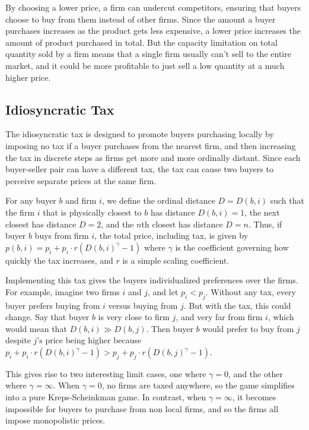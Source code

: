 \documentclass[11pt]{article}
\begin{document}
By choosing a lower price, a firm can undercut competitors, ensuring that
buyers choose to buy from them instead of other firms. Since the amount a buyer
purchases increases as the product gets less expensive, a lower price increases
the amount of product purchased in total. But the capacity limitation on total
quantity sold by a firm means that a single firm usually can't sell to the
entire market, and it could be more profitable to just sell a low quantity at a
much higher price.

\subsection{Idiosyncratic Tax}
The idiosyncratic tax is designed to promote buyers purchasing locally by
imposing no tax if a buyer purchases from the nearest firm, and then increasing
the tax in discrete steps as firms get more and more ordinally distant. Since
each buyer-seller pair can have a different tax, the tax can cause two buyers
to perceive separate prices at the same firm.

For any buyer $b$ and firm $i$, we define the ordinal distance $D = D(b,i)$
such that the firm $i$ that is physically closest to $b$ has distance
$D(b,i)=1$, the next closest has distance $D=2$, and the $n$th closest has
distance $D=n$.  Thus, if buyer $b$ buys from firm $i$, the total price,
including tax, is given by $p(b,i) = p_i + p_i \cdot r(D(b,i)^\gamma -1)$
where $\gamma$ is the coefficient governing how quickly the tax increases, and
$r$ is a simple scaling coefficient.

Implementing this tax gives the buyers individualized preferences
over the firms. For example, imagine two firms $i$ and $j$, and let $p_i <
p_j$. Without any tax, every buyer prefers buying from $i$ versus buying from
$j$. But with the tax, this could change. Say that buyer $b$ is very close to
firm $j$, and very far from firm $i$, which would mean that $D(b,i) \gg
D(b,j)$. Then buyer $b$ would prefer to buy from $j$ despite $j$'s price
being higher because $p_i + p_i\cdot r(D(b,i)^\gamma - 1) > p_j + p_j\cdot
r(D(b,j)^\gamma -1)$. 

This gives rise to two interesting limit cases, one where $\gamma = 0$, and the
other where $\gamma = \infty$. When $\gamma = 0$, no firms are taxed anywhere,
so the game simplifies into a pure Kreps-Scheinkman game. In contrast, when
$\gamma = \infty$, it becomes impossible for buyers to purchase from non local
firms, and so the firms all impose monopolistic prices.
\end{document}
